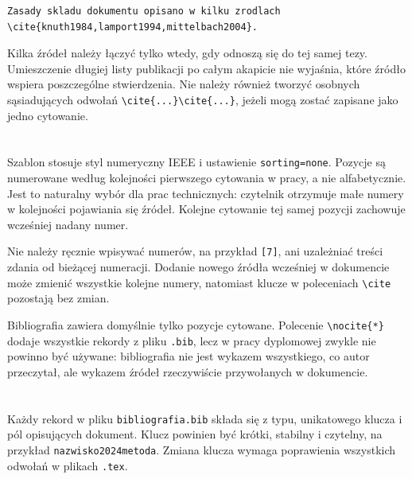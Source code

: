 \begin{lstlisting}[style=thesis,caption={Kilka pozycji w jednym odwołaniu bibliograficznym},label={lst:cytowanie-wielokrotne}]
Zasady skladu dokumentu opisano w kilku zrodlach
\cite{knuth1984,lamport1994,mittelbach2004}.
\end{lstlisting}

Kilka źródeł należy łączyć tylko wtedy, gdy odnoszą się do tej samej tezy. Umieszczenie długiej listy publikacji po całym akapicie nie wyjaśnia, które źródło wspiera poszczególne stwierdzenia. Nie należy również tworzyć osobnych sąsiadujących odwołań \verb|\cite{...}\cite{...}|, jeżeli mogą zostać zapisane jako jedno cytowanie.

\section{}

Szablon stosuje styl numeryczny IEEE i ustawienie \texttt{sorting=none}. Pozycje są numerowane według kolejności pierwszego cytowania w pracy, a nie alfabetycznie. Jest to naturalny wybór dla prac technicznych: czytelnik otrzymuje małe numery w kolejności pojawiania się źródeł. Kolejne cytowanie tej samej pozycji zachowuje wcześniej nadany numer.

Nie należy ręcznie wpisywać numerów, na przykład \verb|[7]|, ani uzależniać treści zdania od bieżącej numeracji. Dodanie nowego źródła wcześniej w dokumencie może zmienić wszystkie kolejne numery, natomiast klucze w poleceniach \verb|\cite| pozostają bez zmian.

Bibliografia zawiera domyślnie tylko pozycje cytowane. Polecenie \verb|\nocite{*}| dodaje wszystkie rekordy z pliku \texttt{.bib}, lecz w pracy dyplomowej zwykle nie powinno być używane: bibliografia nie jest wykazem wszystkiego, co autor przeczytał, ale wykazem źródeł rzeczywiście przywołanych w dokumencie.

\section{}

Każdy rekord w pliku \texttt{bibliografia.bib} składa się z typu, unikatowego klucza i pól opisujących dokument. Klucz powinien być krótki, stabilny i czytelny, na przykład \texttt{nazwisko2024metoda}. Zmiana klucza wymaga poprawienia wszystkich odwołań w plikach \texttt{.tex}.

